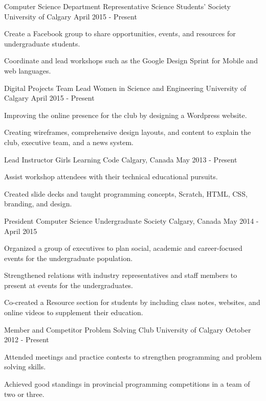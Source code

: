 \begin{cventries}
  \cventry
    {Computer Science Department Representative}
    {Science Students' Society}
    {University of Calgary}
    {April 2015 - Present}
    {
      \begin{cvitems}
        \item {Create a Facebook group to share opportunities, events, and resources for undergraduate students.}
        \item {Coordinate and lead workshops such as the Google Design Sprint for Mobile and web languages.}
      \end{cvitems}
    }
  \cventry
    {Digital Projects Team Lead}
    {Women in Science and Engineering}
    {University of Calgary}
    {April 2015 - Present}
    {
      \begin{cvitems}
        \item {Improving the online presence for the club by designing a Wordpress website.}
        \item {Creating wireframes, comprehensive design layouts, and content to explain the club, executive team, and a news system.}
      \end{cvitems}
    }
  \cventry
    {Lead Instructor}
    {Girls Learning Code}
    {Calgary, Canada}
    {May 2013 - Present}
    {
      \begin{cvitems}
        \item {Assist workshop attendees with their technical educational pursuits.}
        \item {Created slide decks and taught programming concepts, Scratch, HTML, CSS, branding, and design.}
      \end{cvitems}
    }
  \cventry
    {President}
    {Computer Science Undergraduate Society}
    {Calgary, Canada}
    {May 2014 - April 2015}
    {
      \begin{cvitems}
        \item {Organized a group of executives to plan social, academic and career-focused events for the undergraduate population.}
        \item {Strengthened relations with industry representatives and staff members to present at events for the undergraduates.}
        \item {Co-created a Resource section for students by including class notes, websites, and online videos to supplement their education.}
      \end{cvitems}
    }
  \cventry
    {Member and Competitor}
    {Problem Solving Club}
    {University of Calgary}
    {October 2012 - Present}
    {
      \begin{cvitems}
        \item {Attended meetings and practice contests to strengthen programming and problem solving skills.}
        \item {Achieved good standings in provincial programming competitions in a team of two or three.}
      \end{cvitems}
    }
\end{cventries}
